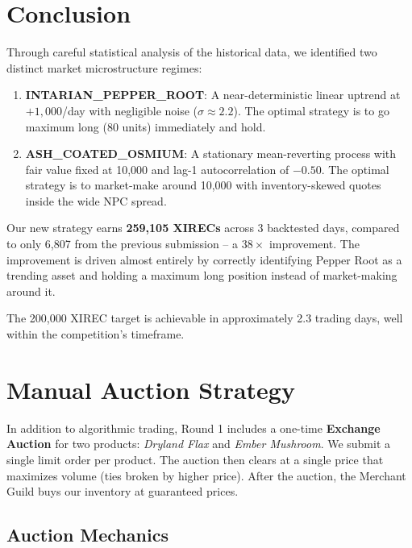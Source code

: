 \documentclass[11pt,a4paper]{article}
\begin{document}
\section{Conclusion}

Through careful statistical analysis of the historical data, we identified two distinct market microstructure regimes:

\begin{enumerate}
    \item \textbf{INTARIAN\_PEPPER\_ROOT}: A near-deterministic linear uptrend at $+1{,}000$/day with negligible noise ($\sigma \approx 2.2$). The optimal strategy is to go maximum long (80 units) immediately and hold.

    \item \textbf{ASH\_COATED\_OSMIUM}: A stationary mean-reverting process with fair value fixed at 10,000 and lag-1 autocorrelation of $-0.50$. The optimal strategy is to market-make around 10,000 with inventory-skewed quotes inside the wide NPC spread.
\end{enumerate}

Our new strategy earns \textbf{259,105 XIRECs} across 3 backtested days, compared to only 6,807 from the previous submission -- a $38\times$ improvement. The improvement is driven almost entirely by correctly identifying Pepper Root as a trending asset and holding a maximum long position instead of market-making around it.

The 200,000 XIREC target is achievable in approximately 2.3 trading days, well within the competition's timeframe.

\section{Manual Auction Strategy}

In addition to algorithmic trading, Round 1 includes a one-time \textbf{Exchange Auction} for two products: \textit{Dryland Flax} and \textit{Ember Mushroom}. We submit a single limit order per product. The auction then clears at a single price that maximizes volume (ties broken by higher price). After the auction, the Merchant Guild buys our inventory at guaranteed prices.

\subsection{Auction Mechanics}
\end{document}
